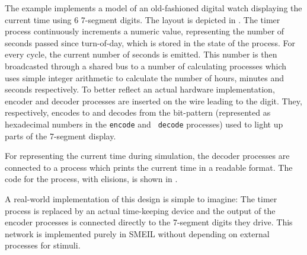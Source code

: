   The example implements a model of an old-fashioned digital watch displaying
  the current time using 6 7-segment digits. The layout is depicted in
  . The timer process continuously increments a numeric value,
  representing the number of seconds passed since turn-of-day, which is stored
  in the state of the process. For every cycle, the current number of seconds is
  emitted. This number is then broadcasted through a shared bus to a number of
  calculating processes which uses simple integer arithmetic to calculate the
  number of hours, minutes and seconds respectively. To better reflect an actual
  hardware implementation, encoder and decoder processes are inserted on the
  wire leading to the digit. They, respectively, encodes to and decodes from the
  bit-pattern (represented as hexadecimal numbers in the {\tt encode} and {\tt
    decode} processes) used to light up parts of the 7-segment display.

  For representing the current time during simulation, the decoder processes are
  connected to a process which prints the current time in a readable format. The
  code for the process, with elisions, is shown in .

  A real-world implementation of this design is simple to imagine: The timer
  process is replaced by an actual time-keeping device and the output of the
  encoder processes is connected directly to the 7-segment digits they
  drive. This network is implemented purely in SMEIL without depending on
  external processes for stimuli.

